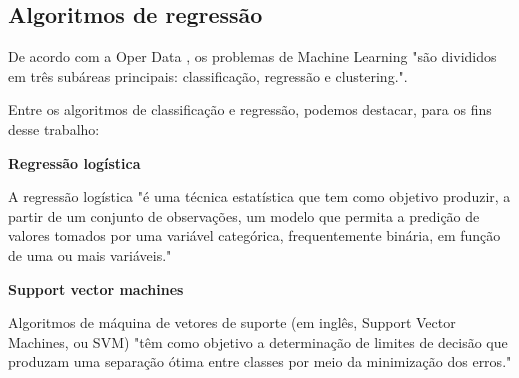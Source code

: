         \subsection{Algoritmos de regressão}
	    De acordo com a Oper Data \cite{oper2020}, os problemas de Machine Learning "são divididos em três subáreas principais: classificação, regressão e clustering.".
	    
	    Entre os algoritmos de classificação e regressão, podemos destacar, para os fins desse trabalho:\newline


		    \textbf{Regressão logística}\par
		    A regressão logística "é uma técnica estatística que tem como objetivo produzir, a partir de um conjunto de observações, um modelo que permita a predição de valores tomados por uma variável categórica, frequentemente binária, em função de uma ou mais variáveis." \cite{gonzalez2018}\newline

		    \textbf{Support vector machines}\par
		     Algoritmos de máquina de vetores de suporte (em inglês, Support Vector Machines, ou SVM) "têm como objetivo a determinação de limites de decisão que produzam uma separação ótima entre classes por meio da minimização dos erros." \cite{nascimento2009}\newline



